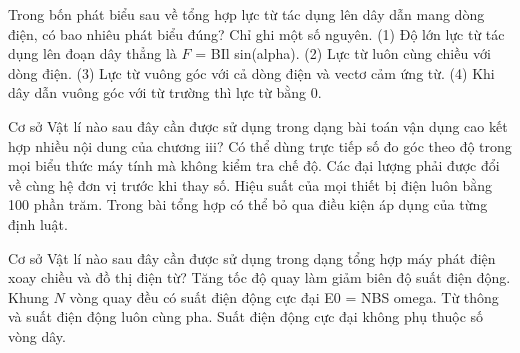 \begin{ex}
Trong bốn phát biểu sau về tổng hợp lực từ tác dụng lên dây dẫn mang dòng điện, có bao nhiêu phát biểu đúng? Chỉ ghi một số nguyên. (1) Độ lớn lực từ tác dụng lên đoạn dây thẳng là $F$ = BIl sin(alpha). (2) Lực từ luôn cùng chiều với dòng điện. (3) Lực từ vuông góc với cả dòng điện và vectơ cảm ứng từ. (4) Khi dây dẫn vuông góc với từ trường thì lực từ bằng 0.
\end{ex}

\begin{ex}
Cơ sở Vật lí nào sau đây cần được sử dụng trong dạng bài toán vận dụng cao kết hợp nhiều nội dung của chương iii?
\choice
{Có thể dùng trực tiếp số đo góc theo độ trong mọi biểu thức máy tính mà không kiểm tra chế độ.}
{\True Các đại lượng phải được đổi về cùng hệ đơn vị trước khi thay số.}
{Hiệu suất của mọi thiết bị điện luôn bằng 100 phần trăm.}
{Trong bài tổng hợp có thể bỏ qua điều kiện áp dụng của từng định luật.}
\end{ex}

\begin{ex}
Cơ sở Vật lí nào sau đây cần được sử dụng trong dạng tổng hợp máy phát điện xoay chiều và đồ thị điện từ?
\choice
{Tăng tốc độ quay làm giảm biên độ suất điện động.}
{\True Khung $N$ vòng quay đều có suất điện động cực đại E0 = NBS omega.}
{Từ thông và suất điện động luôn cùng pha.}
{Suất điện động cực đại không phụ thuộc số vòng dây.}
\end{ex}

